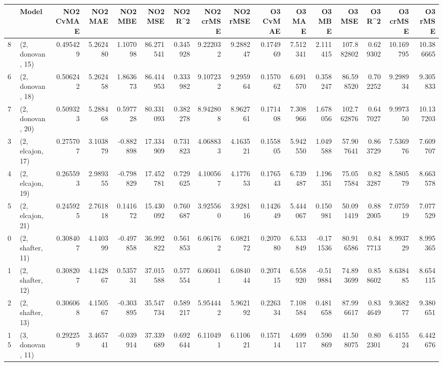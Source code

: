 \begin{tabular}{llrrrrrrrrrrrrrr}
\toprule
{} &             Model &  NO2 CvMAE &   NO2 MAE &   NO2 MBE &    NO2 MSE &   NO2 R\textasciicircum2 &  NO2 crMSE &  NO2 rMSE &  O3 CvMAE &     O3 MAE &    O3 MBE &      O3 MSE &    O3 R\textasciicircum2 &   O3 crMSE &    O3 rMSE \\
\midrule
8  &  (2, donovan, 15) &   0.495429 &  5.262480 &  1.107098 &  86.271541 &  0.345928 &   9.222032 &  9.288247 &  0.174969 &   7.512341 &  2.111415 &  107.882802 &  0.629302 &  10.169795 &  10.386665 \\
6  &  (2, donovan, 18) &   0.506242 &  5.262458 &  1.863673 &  86.414953 &  0.333982 &   9.107232 &  9.295964 &  0.157062 &   6.691570 &  0.358247 &   86.598520 &  0.702252 &   9.298934 &   9.305833 \\
7  &  (2, donovan, 20) &   0.509323 &  5.288468 &  0.597728 &  80.331093 &  0.382278 &   8.942808 &  8.962761 &  0.171408 &   7.308966 &  1.678056 &  102.762876 &  0.647027 &   9.997350 &  10.137203 \\
3  &  (2, elcajon, 17) &   0.275707 &  3.103879 & -0.882898 &  17.334909 &  0.731823 &   4.068833 &  4.163521 &  0.155805 &   5.942550 &  1.049588 &   57.907641 &  0.863729 &   7.536976 &   7.609707 \\
4  &  (2, elcajon, 19) &   0.265593 &  2.989355 & -0.798829 &  17.452781 &  0.729625 &   4.100567 &  4.177653 &  0.176543 &   6.739487 &  1.196351 &   75.057584 &  0.823287 &   8.580579 &   8.663578 \\
5  &  (2, elcajon, 21) &   0.245925 &  2.761818 &  0.141672 &  15.430092 &  0.760687 &   3.925560 &  3.928116 &  0.142649 &   5.444067 &  0.150981 &   50.091419 &  0.882005 &   7.075919 &   7.077529 \\
0  &  (2, shafter, 11) &   0.308407 &  4.140399 & -0.497858 &  36.992822 &  0.561853 &   6.061762 &  6.082172 &  0.207080 &   6.533849 & -0.171536 &   80.916586 &  0.847713 &   8.993729 &   8.995365 \\
1  &  (2, shafter, 12) &   0.308207 &  4.142867 &  0.535731 &  37.015588 &  0.577554 &   6.060411 &  6.084044 &  0.207415 &   6.558920 & -0.519884 &   74.893699 &  0.858602 &   8.638485 &   8.654115 \\
2  &  (2, shafter, 13) &   0.306068 &  4.150567 & -0.303895 &  35.547734 &  0.589217 &   5.954442 &  5.962192 &  0.226334 &   7.108584 &  0.481658 &   87.996617 &  0.834649 &   9.368277 &   9.380651 \\
15 &  (3, donovan, 11) &   0.292259 &  3.465741 & -0.039914 &  37.339689 &  0.692644 &   6.110491 &  6.110621 &  0.157114 &   4.699117 &  0.590869 &   41.508075 &  0.802301 &   6.415524 &   6.442676 \\

\end{tabular}
